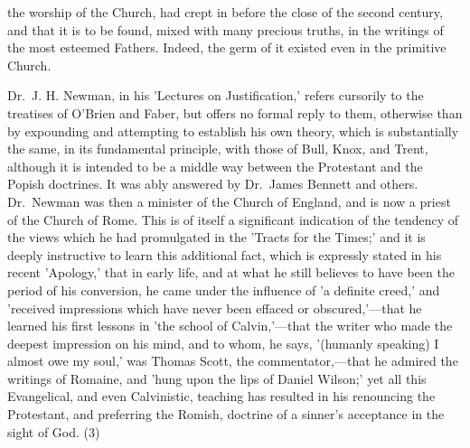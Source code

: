 \documentclass[
]{book}
\begin{document}
the worship of the Church, had crept in before the close of the second century, and that it is to be found, mixed with many precious truths, in the writings of the most esteemed Fathers. Indeed, the germ of it existed even in the primitive Church.

Dr.~J. H. Newman, in his 'Lectures on Justification,' refers cursorily to the treatises of O'Brien and Faber, but offers no formal reply to them, otherwise than by expounding and attempting to establish his own theory, which is substantially the same, in its fundamental principle, with those of Bull, Knox, and Trent, although it is intended to be a middle way between the Protestant and the Popish doctrines. It was ably answered by Dr.~James Bennett and others. Dr.~Newman was then a minister of the Church of England, and is now a priest of the Church of Rome. This is of itself a significant indication of the tendency of the views which he had promulgated in the 'Tracts for the Times;' and it is deeply instructive to learn this additional fact, which is expressly stated in his recent 'Apology,' that in early life, and at what he still believes to have been the period of his conversion, he came under the influence of 'a definite creed,' and 'received impressions which have never been effaced or obscured,'---that he learned his first lessons in 'the school of Calvin,'---that the writer who made the deepest impression on his mind, and to whom, he says, '(humanly speaking) I almost owe my soul,' was Thomas Scott, the commentator,---that he admired the writings of Romaine, and 'hung upon the lips of Daniel Wilson;' yet all this Evangelical, and even Calvinistic, teaching has resulted in his renouncing the Protestant, and preferring the Romish, doctrine of a sinner's acceptance in the sight of God. (3)
\end{document}
